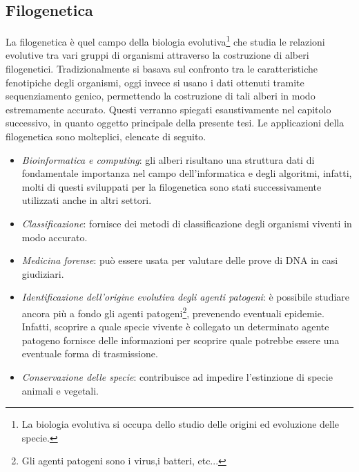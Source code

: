 \subsection{Filogenetica}
La filogenetica è quel campo della biologia evolutiva\footnote{La biologia evolutiva si occupa dello studio delle origini ed evoluzione delle specie.} che studia le relazioni evolutive tra vari gruppi di organismi attraverso la costruzione di alberi filogenetici.
Tradizionalmente si basava sul confronto tra le caratteristiche fenotipiche degli organismi, oggi invece si usano i dati ottenuti tramite sequenziamento genico, permettendo la costruzione di tali alberi in modo estremamente accurato. Questi verranno spiegati esaustivamente nel capitolo successivo, in quanto oggetto principale della presente tesi.
\newline
Le applicazioni della filogenetica sono molteplici, elencate di seguito.
\begin{itemize}
	\item \textit{Bioinformatica e computing}: gli alberi risultano una struttura dati di fondamentale importanza nel campo dell'informatica e degli algoritmi, infatti, molti di questi sviluppati per la filogenetica sono stati successivamente utilizzati anche in altri settori.
	\item \textit{Classificazione}: fornisce dei metodi di classificazione degli organismi viventi in modo accurato.
	\item \textit{Medicina forense}: può essere usata per valutare delle prove di DNA in casi giudiziari.
	\item \textit{Identificazione dell'origine evolutiva degli agenti patogeni}: è possibile studiare ancora più a fondo gli agenti patogeni\footnote{Gli agenti patogeni sono i virus,i  batteri, etc...}, prevenendo eventuali epidemie. Infatti, scoprire a quale specie vivente è collegato un determinato agente patogeno fornisce delle informazioni per scoprire quale potrebbe essere una eventuale forma di trasmissione.
	\item \textit{Conservazione delle specie}: contribuisce ad impedire l'estinzione di specie animali e vegetali.
\end{itemize}

